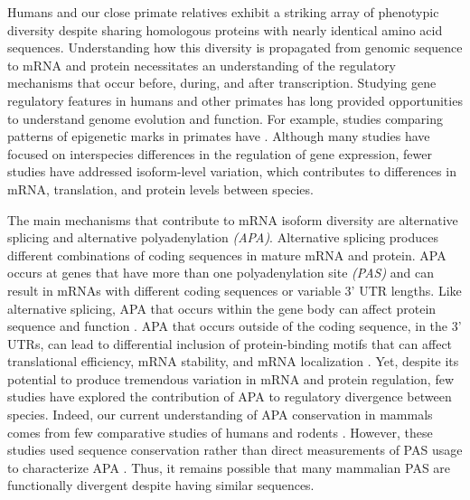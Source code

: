 Humans and our close primate relatives exhibit a striking array of phenotypic diversity despite sharing homologous proteins with nearly identical amino acid sequences. Understanding how this diversity is propagated from genomic sequence to mRNA and protein necessitates an understanding of the regulatory mechanisms that occur before, during, and after transcription.  Studying gene regulatory features in humans and other primates has long provided opportunities to understand genome evolution and function. For example, studies comparing patterns of epigenetic marks in primates have \citep{banovich_methylation_2014, cain_gene_2011,McVicker2013, pai_genome-wide_2011}. Although many studies have focused on interspecies differences in the regulation of gene expression, fewer studies have addressed isoform-level variation, which contributes to differences in mRNA, translation, and protein levels between species.  

The main mechanisms that contribute to mRNA isoform diversity are alternative splicing and alternative polyadenylation \emph{(APA)}. Alternative splicing produces different combinations of coding sequences in mature mRNA and protein. APA occurs at genes that have more than one polyadenylation site \emph{(PAS)} and can result in mRNAs with different coding sequences or variable 3' UTR lengths. Like alternative splicing, APA that occurs within the gene body can affect protein sequence and function \citep{lee_widespread_2018, pan_intronic_2006, sandberg_proliferating_2008, tian_alternative_2017, vasudevan_non-stop_2002, yao_genomewide_2018}. APA that occurs outside of the coding sequence, in the 3' UTRs, can lead to differential inclusion of protein-binding motifs that can affect translational efficiency, mRNA stability, and mRNA localization  \citep{mayr_regulation_2017, tian_alternative_2017}. Yet, despite its potential to produce tremendous variation in mRNA and protein regulation, few studies have explored the contribution of APA to regulatory divergence between species. Indeed, our current understanding of APA conservation in mammals comes from few comparative studies of humans and rodents \citep{ara_conservation_2006, wang_compendium_2018}. However, these studies used sequence conservation rather than direct measurements of PAS usage to characterize APA \citep{wang_compendium_2018}. Thus, it remains possible that many mammalian PAS are functionally divergent despite having similar sequences. 

